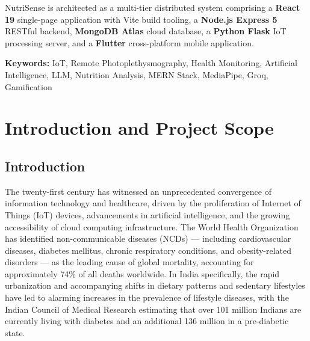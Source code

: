 \documentclass[12pt,a4paper]{report}
\begin{document}
NutriSense is architected as a multi-tier distributed system comprising a \textbf{React 19} single-page application with Vite build tooling, a \textbf{Node.js Express 5} RESTful backend, \textbf{MongoDB Atlas} cloud database, a \textbf{Python Flask} IoT processing server, and a \textbf{Flutter} cross-platform mobile application.

\vspace{0.5cm}
\noindent\textbf{Keywords:} IoT, Remote Photoplethysmography, Health Monitoring, Artificial Intelligence, LLM, Nutrition Analysis, MERN Stack, MediaPipe, Groq, Gamification

\newpage
\tableofcontents

\newpage
\listoffigures

\newpage
\listoftables

\chapter{Introduction and Project Scope}

\section{Introduction}
The twenty-first century has witnessed an unprecedented convergence of information technology and healthcare, driven by the proliferation of Internet of Things (IoT) devices, advancements in artificial intelligence, and the growing accessibility of cloud computing infrastructure. The World Health Organization has identified non-communicable diseases (NCDs) --- including cardiovascular diseases, diabetes mellitus, chronic respiratory conditions, and obesity-related disorders --- as the leading cause of global mortality, accounting for approximately 74\% of all deaths worldwide. In India specifically, the rapid urbanization and accompanying shifts in dietary patterns and sedentary lifestyles have led to alarming increases in the prevalence of lifestyle diseases, with the Indian Council of Medical Research estimating that over 101 million Indians are currently living with diabetes and an additional 136 million in a pre-diabetic state.
\end{document}
